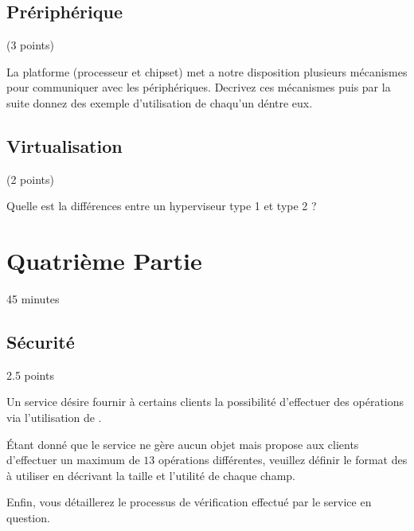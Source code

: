 \subsection{Pr\'eriph\'erique} (3 points)

La platforme (processeur et chipset) met a notre disposition plusieurs
m\'ecanismes pour communiquer avec les p\'eriph\'eriques. Decrivez ces
m\'ecanismes puis par la suite donnez des exemple d'utilisation de
chaqu'un d\'entre eux.

\begin{correction}
\end{correction}

\subsection{Virtualisation} (2 points)

Quelle est la diff\'erences entre un hyperviseur type 1 et type 2 ?

\begin{correction}
\end{correction}

%
%

\section{Quatri\`eme Partie}
{\hfill{} \scriptsize{45 minutes}}

%
%
\subsection{S\'ecurit\'e}
{\hfill{} \scriptsize{2.5 points}}

Un service d\'esire fournir \`a certains clients la possibilit\'e
d'effectuer des op\'erations via l'utilisation de .

\'Etant donn\'e que le service ne g\`ere aucun objet mais propose
aux clients d'effectuer un maximum de $13$ op\'erations diff\'erentes,
veuillez d\'efinir le format des  \`a utiliser en
d\'ecrivant la taille et l'utilit\'e de chaque champ.

Enfin, vous d\'etaillerez le processus de v\'erification effectu\'e
par le service en question.

